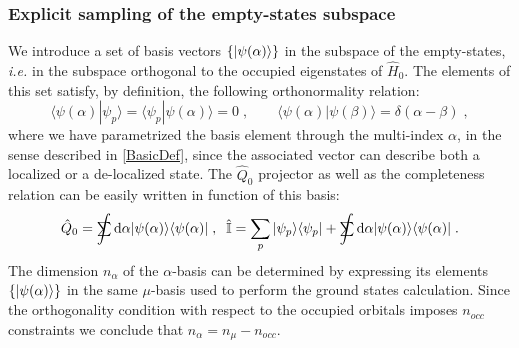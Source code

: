 \documentclass[a4paper]{article}
\newcommand{\dd}{{\rm d}}
\newcommand{\sint}{\mathrlap{\displaystyle\int}
\mathrlap{\textstyle\sum}
\phantom{\mathrlap{\displaystyle
\int}\textstyle\sum}}
\newcommand{\be}{\begin{equation}}
\newcommand{\ee}{\end{equation}}
\newcommand{\qq}{\qquad}
\newcommand{\lb}{\label}
\newcommand{\op}[1]{\hat {#1}}
\newcommand{\brket}[2]{\langle  #1 | #2 \rangle} %
\newcommand{\ketbra}[2]{| #1 \rangle \langle #2 |}
\newcommand{\hnot}{\op{H}_0}
\newcommand{\identity}{\op{\mathbb I}}
\begin{document}
\subsubsection{Explicit sampling of the empty-states subspace}

We introduce a set of basis vectors $\{\ket{\psi(\alpha)}\}$ in the subspace of the empty-states, \emph{i.e.} in the subspace orthogonal to the occupied eigenstates of $\hnot$. 
The elements of this set satisfy, by definition, the following orthonormality relation: 
\be\lb{psiAlphaDef1}%
\brket{\psi(\alpha)}{\psi_p} = \brket{\psi_p}{\psi(\alpha)} = 0 \;, \qq
\brket{\psi(\alpha)}{\psi(\beta)} = \delta(\alpha-\beta) \;,
\ee
where we have parametrized the basis element through the multi-index $\alpha$, in the sense described in \ref{BasicDef}, since the associated vector can describe both a localized or a 
de-localized state. The $\op Q_0$ projector as well as the completeness relation can be easily written in function of this basis: 
\be\lb{psiAlphaQ0}
\op Q_0 = \sint\dd\alpha\ketbra{\psi(\alpha)}{\psi(\alpha)} \;, \;\; 
\identity = \sum_p\ketbra{\psi_p}{\psi_p} + \sint\dd\alpha\ketbra{\psi(\alpha)}{\psi(\alpha)} \;.
\ee
The dimension $n_\alpha$ of the $\alpha$-basis can be determined by expressing its elements $\{\ket{\psi(\alpha)}\}$ in the same $\mu$-basis used to perform the ground states calculation. 
Since the orthogonality condition with respect to the occupied orbitals imposes $n_{occ}$ constraints we conclude that $n_\alpha=n_\mu-n_{occ}$. 


% 
\end{document}
